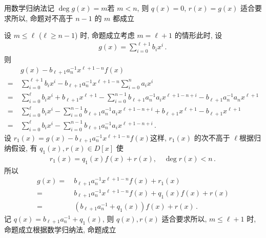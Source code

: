 \begin{pf}
    用数学归纳法\period 记 $\deg g(x) = m$\period 若 $m<n$, 则 $q(x) = 0$, $r(x) = g(x)$ 适合要求\period 所以, 命题对不高于 $n-1$ 的 $m$ 都成立\period

    设 $m \leq \ell$ ($\ell \geq n-1$) 时, 命题成立\period 考虑 $m=\ell+1$ 的情形\period 此时, 设
    \begin{align*}
        g(x) = \sum_{i = 0}^{\ell + 1} b_i x^i \period
    \end{align*}
    则
    \begin{align*}
             & g(x) - b_{\ell+1} a_n^{-1} x^{\ell+1-n} f(x)                                                                                                         \\
        = \  & \sum_{i = 0}^{\ell+1} b_i x^i - b_{\ell+1} a_n^{-1} x^{\ell+1-n} \sum_{i = 0}^{n} a_i x^i                                                            \\
        = \  & \sum_{i = 0}^{\ell} b_i x^i + b_{\ell+1} x^{\ell+1} - \sum_{i = 0}^{n-1} b_{\ell+1} a_n^{-1} a_i x^{\ell+1-n+i} - b_{\ell+1} a_n^{-1} a_n x^{\ell+1} \\
        = \  & \sum_{i = 0}^{\ell} b_i x^i  - \sum_{i = 0}^{n-1} b_{\ell+1} a_n^{-1} a_i x^{\ell+1-n+i} + b_{\ell+1} x^{\ell+1} - b_{\ell+1} x^{\ell+1}             \\
        = \  & \sum_{i = 0}^{\ell} b_i x^i  - \sum_{i = 0}^{n-1} b_{\ell+1} a_n^{-1} a_i x^{\ell+1-n+i}\period
    \end{align*}
    设 $r_1 (x) = g(x) - b_{\ell+1} a_n^{-1} x^{\ell+1-n} f(x)$\period 这样, $r_1 (x)$ 的次不高于 $\ell$\period 根据归纳假设, 有 $q_1 (x), r(x) \in D[x]$ 使
    \begin{align*}
        r_1 (x) = q_1 (x) f(x) + r(x), \quad \deg r(x) < n \period
    \end{align*}
    所以
    \begin{align*}
        g(x)
        = \  & b_{\ell+1} a_n^{-1} x^{\ell+1-n} f(x) + r_1 (x)             \\
        = \  & b_{\ell+1} a_n^{-1} x^{\ell+1-n} f(x) + q_1 (x) f(x) + r(x) \\
        = \  & (b_{\ell+1} a_n^{-1} + q_1 (x)) f(x) + r(x) \period
    \end{align*}
    记 $q(x) = b_{\ell+1} a_n^{-1} + q_1 (x)$, 则 $q(x), r(x)$ 适合要求\period 所以, $m \leq \ell + 1$ 时, 命题成立\period 根据数学归纳法, 命题成立\period
\end{pf}

